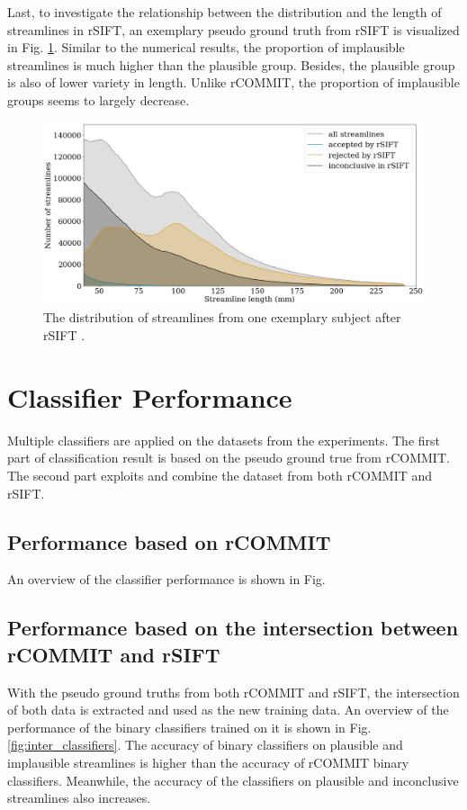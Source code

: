 Last, to investigate the relationship between the distribution and the length of streamlines in rSIFT, an exemplary 
pseudo ground truth from rSIFT is visualized in Fig. \ref*{fig:threegroup_sift}. Similar to the numerical results,
the proportion of implausible streamlines is much higher than the plausible group. Besides, the plausible group is also of lower variety in length.
Unlike rCOMMIT, the proportion of implausible groups seems to largely decrease.

\begin{figure}[ht]
    \centering
    \includegraphics[width= 12cm]{figures/distribution_sift.png}
    \caption{The distribution of streamlines from one exemplary subject after rSIFT \cite{hainAssessingStreamlinePlausibility2022}. }
\label{fig:threegroup_sift}
\end{figure}


\section{Classifier Performance}
Multiple classifiers are applied on the datasets from the experiments. The first part of classification result
is based on the pseudo ground true from rCOMMIT. The second part exploits and combine the dataset 
from both rCOMMIT and rSIFT.
\subsection{Performance based on rCOMMIT}

An overview of the classifier performance is shown in Fig.



\subsection{Performance based on the intersection between rCOMMIT and rSIFT}
With the pseudo ground truths from both rCOMMIT and rSIFT, the intersection of both data is extracted and used as the new training data.
An overview of the performance of the binary classifiers trained on it is shown in Fig. \ref{fig:inter_classifiers}.
The accuracy of binary classifiers on plausible and implausible streamlines is higher than the accuracy of rCOMMIT binary classifiers.
Meanwhile, the accuracy of the classifiers on plausible and inconclusive streamlines also increases.

